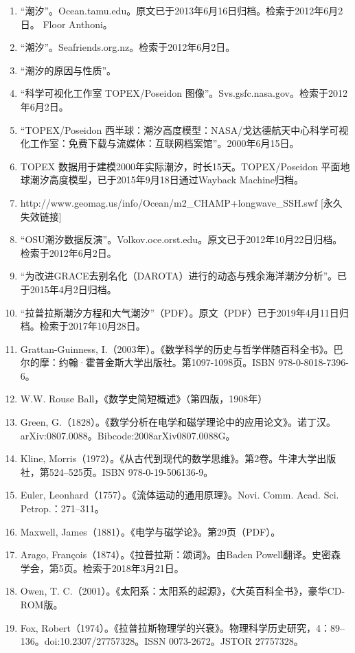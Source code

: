 \begin{enumerate}
\item “潮汐”。Ocean.tamu.edu。原文已于2013年6月16日归档。检索于2012年6月2日。  
Floor Anthoni。
\item “潮汐”。Seafriends.org.nz。检索于2012年6月2日。  
\item “潮汐的原因与性质”。
\item “科学可视化工作室 TOPEX/Poseidon 图像”。Svs.gsfc.nasa.gov。检索于2012年6月2日。  
\item “TOPEX/Poseidon 西半球：潮汐高度模型：NASA/戈达德航天中心科学可视化工作室：免费下载与流媒体：互联网档案馆”。2000年6月15日。  
\item TOPEX 数据用于建模2000年实际潮汐，时长15天。TOPEX/Poseidon 平面地球潮汐高度模型，已于2015年9月18日通过Wayback Machine归档。  
\item http://www.geomag.us/info/Ocean/m2_CHAMP+longwave_SSH.swf [永久失效链接]  
\item “OSU潮汐数据反演”。Volkov.oce.orst.edu。原文已于2012年10月22日归档。检索于2012年6月2日。  
\item “为改进GRACE去别名化（DAROTA）进行的动态与残余海洋潮汐分析”。已于2015年4月2日归档。  
\item “拉普拉斯潮汐方程和大气潮汐”（PDF）。原文（PDF）已于2019年4月11日归档。检索于2017年10月28日。  
\item Grattan-Guinness, I.（2003年）。《数学科学的历史与哲学伴随百科全书》。巴尔的摩：约翰·霍普金斯大学出版社。第1097-1098页。ISBN 978-0-8018-7396-6。
\item W.W. Rouse Ball，《数学史简短概述》（第四版，1908年）  
\item Green, G.（1828）。《数学分析在电学和磁学理论中的应用论文》。诺丁汉。arXiv:0807.0088。Bibcode:2008arXiv0807.0088G。  
\item Kline, Morris（1972）。《从古代到现代的数学思维》。第2卷。牛津大学出版社，第524–525页。ISBN 978-0-19-506136-9。  
\item Euler, Leonhard（1757）。《流体运动的通用原理》。Novi. Comm. Acad. Sci. Petrop.：271–311。  
\item Maxwell, James（1881）。《电学与磁学论》。第29页（PDF）。  
\item Arago, François（1874）。《拉普拉斯：颂词》。由Baden Powell翻译。史密森学会，第5页。检索于2018年3月21日。  
\item Owen, T. C.（2001）。《太阳系：太阳系的起源》，《大英百科全书》，豪华CD-ROM版。  
\item Fox, Robert（1974）。《拉普拉斯物理学的兴衰》。物理科学历史研究，4：89–136。doi:10.2307/27757328。ISSN 0073-2672。JSTOR 27757328。  

\end{enumerate}
